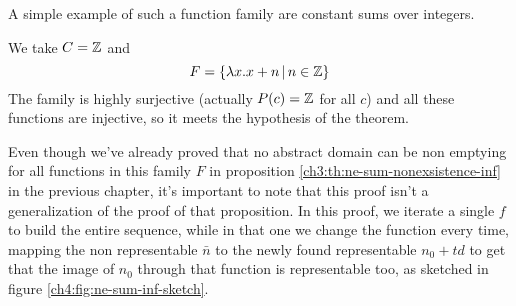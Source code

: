 A simple example of such a function family are constant sums over integers.
\begin{example}
	We take $C = \mathbb{Z}$ and
	\[
	F = \{ \lambda x. x + n \,\vert\, n \in \mathbb{Z} \}
	\]
	The family is highly surjective (actually $P(c) = \mathbb{Z}$ for all $c$) and all these functions are injective, so it meets the hypothesis of the theorem.
\end{example}

Even though we've already proved that no abstract domain can be non emptying for all functions in this family $F$ in proposition \ref{ch3:th:ne-sum-nonexsistence-inf} in the previous chapter, it's important to note that this proof isn't a generalization of the proof of that proposition. In this proof, we iterate a single $f$ to build the entire sequence, while in that one we change the function every time, mapping the non representable $\bar{n}$ to the newly found representable $n_0 + t d$ to get that the image of $n_0$ through that function is representable too, as sketched in figure \ref{ch4:fig:ne-sum-inf-sketch}.

\begin{figure*}[ht]
	\centering
	\caption{Graphical representation of the proof of proposition \ref{ch3:th:ne-sum-nonexsistence-inf}}
	\label{ch4:fig:ne-sum-inf-sketch}
\end{figure*}

